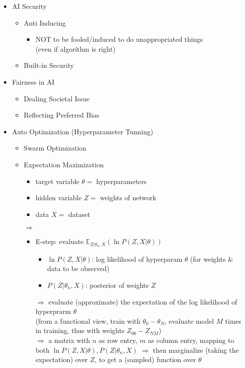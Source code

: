 \begin{itemize}
\item AI Security
	\begin{itemize}
	\item Anti Inducing
		\begin{itemize}
		\item NOT to be fooled/induced to do unappropriated things \\
		(even if algorithm is right)
		\end{itemize}
	\item Built-in Security
	\end{itemize}
\item Fairness in AI
	\begin{itemize}
	\item Dealing Societal Issue
	\item Reflecting Preferred Bias
	\end{itemize}
\item Auto Optimization (Hyperparameter Tunning)
	\begin{itemize}
	\item Swarm Optimization
	\item Expectation Maximization
		\begin{itemize}
		\item target variable $\theta=$ hyperparameters
		\item hidden variable $Z=$ weights of network
		\item data $X=$ dataset
		\end{itemize}
	$\Rightarrow$ 
		\begin{itemize}
		\item E-step: evaluate $\displaystyle \mathbb E_{Z|\theta_n,X}(\ln P(Z,X|\theta))$
			\begin{itemize}
			\item $\ln P(Z, X|\theta)$: log likelihood of hyperparam $\theta$ (for weights \& data to be observed)
			\item $P(Z|\theta_n, X)$: posterior of weights $Z$ 
			\end{itemize}
		$\Rightarrow$ evaluate (approximate) the expectation of the log likelihood of hyperprarm $\theta$ \\
		(from a functional view, train with $\theta_0-\theta_N$, evaluate model $M$ times in training, thus with weights $Z_{00}-Z_{NM}$) \\
		$\Rightarrow$ a matrix with $n$ as row entry, $m$ as column entry, mapping to both $\ln P(Z, X|\theta), P(Z|\theta_n, X)$
		$\Rightarrow$ then marginalize (taking the expectation) over $Z$, to get a (sampled) function over $\theta$

\end{itemize}
\end{itemize}
\end{itemize}
